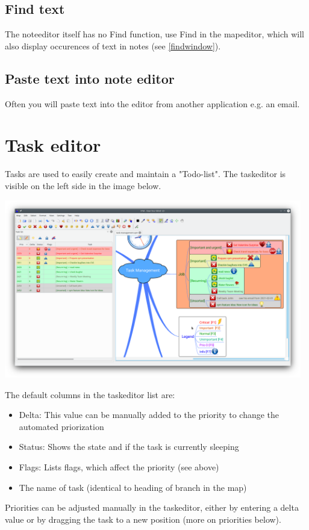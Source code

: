 \documentclass[12pt,a4paper]{article}
\begin{document}
\subsection{Find text}
The noteeditor itself has no Find function, use Find in the mapeditor,
which will also display occurences of text in notes (see
\ref{findwindow}).

\subsection{Paste text into note editor}
Often you will paste text into the editor from another application e.g.
an email.

\section{Task editor} \label{taskeditor}
Tasks are used to easily create and maintain a "Todo-list". 
The taskeditor is visible on the left side in the image below. 
\begin{center}
    \includegraphics[width=13cm]{images/taskeditor.png}
\end{center}

The default columns in the taskeditor list are:
\begin{itemize}
    \item Delta: This value can be manually added to the priority to change the automated priorization
    \item Status: Shows the state and if the task is currently sleeping
    \item Flags: Lists flags, which affect the priority (see above)
    \item The name of task (identical to heading of branch in the map)    
\end{itemize}
Priorities can be adjusted manually in the taskeditor, either by entering a
delta value or by dragging the task to a new position (more on priorities below).
\end{document}
